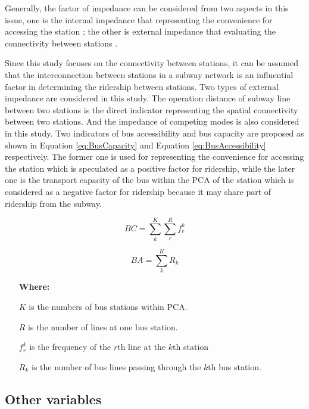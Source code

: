 \documentclass[utf8]{article}
\begin{document}
Generally, the factor of impedance can be considered from two aspects in this issue, one is the internal impedance that representing the convenience for accessing the station \cite{chu2004ridership,chakraborty2013land}; the other is external impedance that evaluating the connectivity between stations \cite{sohn2010factors}.

%
Since this study focuses on the connectivity between stations, it can be assumed that the interconnection between stations in a subway network is an influential factor in determining the ridership between stations. Two types of external impedance are considered in this study. The operation distance of subway line between two stations is the direct indicator representing the spatial connectivity between two stations. And the impedance of competing modes is also considered in this study. Two indicators of bus accessibility and bus capacity are proposed as shown in Equation \ref{eq:BusCapacity} and Equation \ref{eq:BusAccessibility} respectively. The former one is used for representing the convenience for accessing the station which is speculated as a positive factor for ridership, while the later one is the transport capacity of the bus within the PCA of the station which is considered as a negative factor for ridership because it may share part of ridership from the subway.

\begin{equation}
	BC=\sum_{k}^{K}\sum_{r}^{R}f_{r}^{k}
	\label{eq:BusCapacity}
\end{equation}

\begin{equation}
BA=\sum_{k}^{K}R_{k}
\label{eq:BusAccessibility}
\end{equation}

\begin{enumerate}
	\item[\textbf{Where:}]
	\item[$K$] is the numbers of bus stations within PCA.
	\item[$R$] is the number of lines at one bus station.
	\item[$f_{r}^{k}$] is the frequency of the $r$th line at the $k$th station
	\item[$R_k$] is the number of bus lines passing through the $k$th bus station.
\end{enumerate}

%
\subsection{Other variables}
\end{document}
